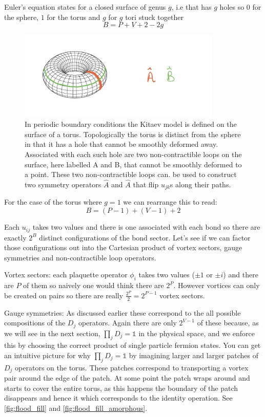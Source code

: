 Euler's equation states for a closed surface of genus \(g\), i.e that has \(g\) holes so \(0\) for the sphere, \(1\) for the torus and \(g\) for \(g\) tori stuck together \[B = P + V + 2 - 2g\]

\begin{figure}
\hypertarget{fig:torus}{%
\centering
\includegraphics[width=0.86\textwidth,height=\textheight]{figure_code/amk_chapter/torus.jpeg}
\caption{In periodic boundary conditions the Kitaev model is defined on the surface of a torus. Topologically the torus is distinct from the sphere in that it has a hole that cannot be smoothly deformed away. Associated with each such hole are two non-contractible loops on the surface, here labelled A and B, that cannot be smoothly deformed to a point. These two non-contractible loops can. be used to construct two symmetry operators \(\hat{A}\) and \(\hat{A}\) that flip \(u_{jk}\)s along their paths.}\label{fig:torus}
}
\end{figure}

For the case of the torus where \(g = 1\) we can rearrange this to read: \[B = (P-1) + (V-1) + 2\]

Each \(u_{ij}\) takes two values and there is one associated with each bond so there are exactly \(2^B\) distinct configurations of the bond sector. Let's see if we can factor those configurations out into the Cartesian product of vortex sectors, gauge symmetries and non-contractible loop operators.

Vortex sectors: each plaquette operator \(\phi_i\) takes two values (\(\pm 1\) or \(\pm i\)) and there are \(P\) of them so naively one would think there are \(2^P\). However vortices can only be created on pairs so there are really \(\tfrac{2^P}{2} = 2^{P-1}\) vortex sectors.

Gauge symmetries: As discussed earlier these correspond to the all possible compositions of the \(D_j\) operators. Again there are only \(2^{V-1}\) of these because, as we will see in the next section, \(\prod_{j} D_j = \mathbb{1}\) in the physical space, and we enforce this by choosing the correct product of single particle fermion states. You can get an intuitive picture for why \(\prod_{j} D_j = \mathbb{1}\) by imagining larger and larger patches of \(D_j\) operators on the torus. These patches correspond to transporting a vortex pair around the edge of the patch. At some point the patch wraps around and starts to cover the entire torus, as this happens the boundary of the patch disappears and hence it which corresponds to the identity operation. See \cref{fig:flood_fill} and \cref{fig:flood_fill_amorphous}.

